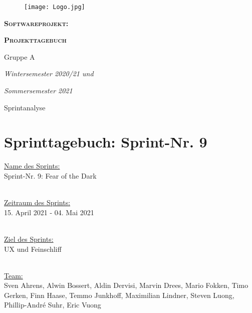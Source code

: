 \documentclass[12pt,a4paper, oneside]{article}
\author{Uni Oldenburg, SWP2020 Gruppe A}
\begin{document}
\begin{titlepage}
\pagestyle{empty}
\begin{center}

\begin{figure}[h]
\centering
\texttt{[image: Logo.jpg]}
\end{figure}

\bigskip \bigskip \noindent
\textsc{\textbf{\LARGE Softwareprojekt:}} \par \bigskip \noindent
\textsc{\textbf{\LARGE Projekttagebuch}}


\par \bigskip \bigskip \bigskip \bigskip \bigskip \noindent
{\Large Gruppe A} \par \medskip \noindent

\par \bigskip \bigskip \bigskip \bigskip \bigskip \bigskip \noindent
\textit{\Large Wintersemester 2020/21 und} \par \noindent
\textit{\Large Sommersemester 2021}

\par \bigskip \bigskip \bigskip \bigskip \bigskip \bigskip \noindent
\par \bigskip \bigskip \bigskip \noindent
{\Large Sprintanalyse} \par \medskip \noindent

\end{center}
\end{titlepage}

\tableofcontents
\pagebreak



\section{Sprinttagebuch: Sprint-Nr. 9}
\underline{Name des Sprints:}
\\Sprint-Nr. 9: Fear of the Dark

\noindent
\\
\underline{Zeitraum des Sprints:}
\\15. April 2021 - 04. Mai 2021

\noindent
\\
\underline{Ziel des Sprints:}
\\UX und Feinschliff


\noindent
\\
\underline {Team:}
\\
Sven Ahrens, Alwin Bossert, Aldin Dervisi, Marvin Drees, Mario Fokken,
Timo Gerken, Finn Haase, Temmo Junkhoff, Maximilian Lindner, Steven Luong, Phillip-André Suhr, Eric Vuong
\end{document}
